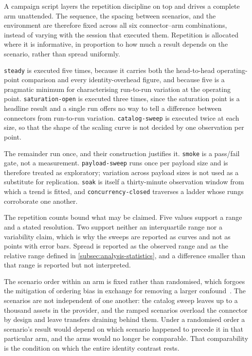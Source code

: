 \pagebreak

A campaign script layers the repetition discipline on top and drives a complete arm unattended. The sequence, the spacing between scenarios, and the environment are therefore fixed across all six connector--arm combinations, instead of varying with the session that executed them. Repetition is allocated where it is informative, in proportion to how much a result depends on the scenario, rather than spread uniformly.

\texttt{steady} is executed five times, because it carries both the head-to-head operating-point comparison and every identity-overhead figure, and because five is a pragmatic minimum for characterising run-to-run variation at the operating point. \texttt{saturation-open} is executed three times, since the saturation point is a headline result and a single run offers no way to tell a difference between connectors from run-to-run variation. \texttt{catalog-sweep} is executed twice at each size, so that the shape of the scaling curve is not decided by one observation per point.

The remainder run once, and their construction justifies it. \texttt{smoke} is a pass/fail gate, not a measurement. \texttt{payload-sweep} runs once per payload size and is therefore treated as exploratory; variation across payload sizes is not used as a substitute for replication. \texttt{soak} is itself a thirty-minute observation window from which a trend is fitted, and \texttt{concurrency-closed} traverses a ladder whose rungs corroborate one another.

The repetition counts bound what may be claimed. Five values support a range and a stated resolution. Two support neither an interquartile range nor a variability claim, which is why the sweeps are reported as curves and not as points with error bars. Spread is reported as the observed range and as the relative range defined in \cref{subsec:analysis-statistics}, and a difference smaller than that range is reported but not interpreted.

The scenario order within an arm is fixed rather than randomised, which forgoes the mitigation of ordering bias in exchange for removing a larger confound~\citep{jain1991art}. The scenarios are not independent of one another: the catalog sweep leaves up to a thousand assets in the provider, and the ramped scenarios overload the connector by design and leave transfers draining behind them. Under a randomised order a scenario's result would depend on which scenario happened to precede it in that particular arm, and the arms would no longer be comparable. That comparability is the condition on which the entire identity contrast rests.

